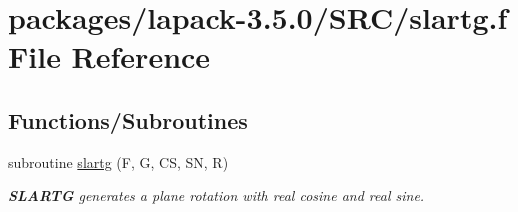 \hypertarget{slartg_8f}{}\section{packages/lapack-\/3.5.0/\+S\+R\+C/slartg.f File Reference}
\label{slartg_8f}
\subsection*{Functions/\+Subroutines}
\begin{DoxyCompactItemize}
\item 
subroutine \hyperlink{group__auxOTHERauxiliary_gaee6602fc79f90ffd7113154b87088302}{slartg} (F, G, C\+S, S\+N, R)
\begin{DoxyCompactList}\small\item\em {\bfseries S\+L\+A\+R\+T\+G} generates a plane rotation with real cosine and real sine. \end{DoxyCompactList}\end{DoxyCompactItemize}
